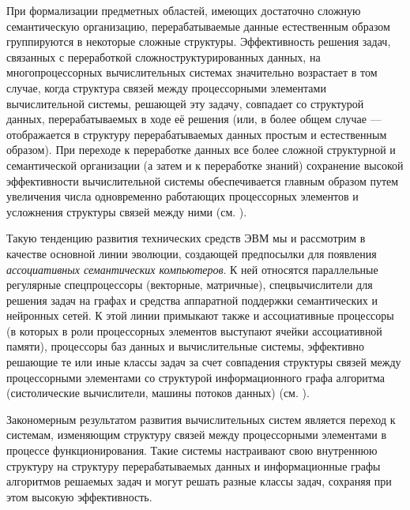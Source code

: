При формализации предметных областей, имеющих достаточно сложную семантическую организацию, перерабатываемые данные естественным образом группируются в некоторые сложные структуры. Эффективность решения задач, связанных с переработкой сложноструктурированных данных, на многопроцессорных вычислительных системах значительно возрастает в том случае, когда структура связей между процессорными элементами вычислительной системы, решающей эту задачу, совпадает со структурой данных, перерабатываемых в ходе её решения (или, в более общем случае --- отображается в структуру перерабатываемых данных простым и естественным образом). При переходе к переработке данных все более сложной структурной и семантической организации (а затем и к переработке знаний) сохранение высокой эффективности вычислительной системы обеспечивается главным образом путем увеличения числа одновременно работающих процессорных элементов и усложнения структуры связей между ними (см. ).

Такую тенденцию развития технических средств ЭВМ мы и рассмотрим в качестве основной линии эволюции, создающей предпосылки для появления \textit{ассоциативных семантических компьютеров}. К ней относятся параллельные регулярные спецпроцессоры (векторные, матричные), спецвычислители для решения задач на графах и средства аппаратной поддержки семантических и нейронных сетей. К этой линии примыкают также и ассоциативные процессоры (в которых в роли процессорных элементов выступают ячейки ассоциативной памяти), процессоры баз данных и вычислительные системы, эффективно решающие те или иные классы задач за счет совпадения структуры связей между процессорными элементами со структурой информационного графа алгоритма (систолические вычислители, машины потоков данных) (см. ).

Закономерным результатом развития вычислительных систем является переход к системам, изменяющим структуру связей между процессорными элементами в процессе функционирования. Такие системы настраивают свою внутреннюю структуру на структуру перерабатываемых данных и информационные графы алгоритмов решаемых задач и могут решать разные классы задач, сохраняя при этом высокую эффективность.

